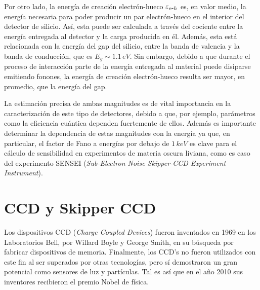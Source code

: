 Por otro lado, la energía de creación electrón-hueco $\varepsilon_{e\mbox{-}h}$ es, en valor medio, la energía necesaria para poder producir un par electrón-hueco en el interior del detector de silicio. Así, esta puede ser calculada a través del cociente entre la energía entregada al detector y la carga producida en él. Además, esta está relacionada con la energía del gap del silicio, entre la banda de valencia y la banda de conducción, que es $E_{g}\sim 1.1\,\si{eV}$\cite{Janesick}. Sin embargo, debido a que durante el proceso de interacción parte de la energía entregada al material puede disiparse emitiendo fonones, la energía de creación electrón-hueco resulta ser mayor, en promedio, que la energía del gap.

La estimación precisa de ambas magnitudes es de vital importancia en la caracterización de este tipo de detectores, debido a que, por ejemplo, parámetros como la eficiencia cuántica dependen fuertemente de ellos. Además es importante determinar la dependencia de estas magnitudes con la energía ya que, en particular, el factor de Fano a energías por debajo de $1\,\si{keV}$ es clave para el cálculo de sensibilidad en experimentos de materia oscura liviana, como es caso del experimento SENSEI (\textit{Sub-Electron Noise Skipper-CCD Experiment Instrument})\cite{barak}.
\section{CCD y Skipper CCD}
\noindent Los dispositivos CCD (\textit{Charge Coupled Devices}) fueron inventados en 1969 en los Laboratorios Bell, por Willard Boyle y George Smith, en su búsqueda por fabricar dispositivos de memoria. Finalmente, los CCD's no fueron utilizados con este fin al ser superados por otras tecnologías, pero sí demostraron un gran potencial como sensores de luz y partículas. Tal es así que en el año 2010 sus inventores recibieron el premio Nobel de física\cite{Boyle, Smith}.

